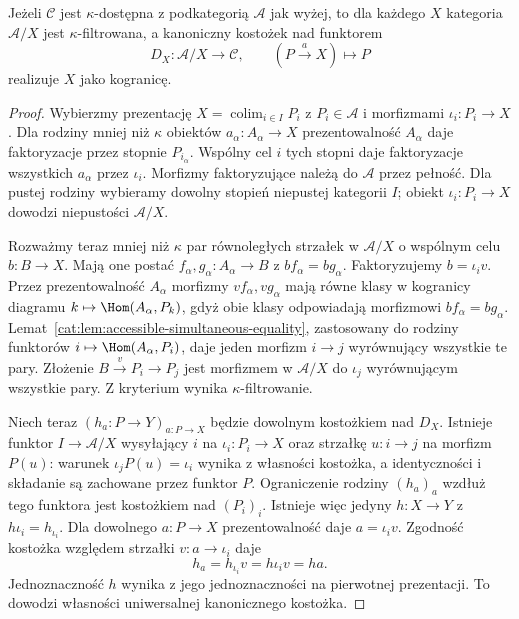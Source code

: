 \begin{twierdzenie}\label{cat:thm:accessible-canonical-diagram}
Jeżeli $\mathcal C$ jest $\kappa$-dostępna z podkategorią $\mathcal A$ jak wyżej, to dla każdego $X$ kategoria $\mathcal A/X$ jest $\kappa$-filtrowana, a kanoniczny kostożek nad funktorem
\[
 D_X:\mathcal A/X\longrightarrow\mathcal C,\qquad
 (P\xrightarrow{a}X)\longmapsto P
\]
realizuje $X$ jako kogranicę.
\end{twierdzenie}
\begin{proof}
Wybierzmy prezentację $X=\operatorname{colim}_{i\in I}P_i$ z $P_i\in\mathcal A$ i morfizmami $\iota_i:P_i\to X$. Dla rodziny mniej niż $\kappa$ obiektów $a_\alpha:A_\alpha\to X$ prezentowalność $A_\alpha$ daje faktoryzacje przez stopnie $P_{i_\alpha}$. Wspólny cel $i$ tych stopni daje faktoryzacje wszystkich $a_\alpha$ przez $\iota_i$. Morfizmy faktoryzujące należą do $\mathcal A$ przez pełność. Dla pustej rodziny wybieramy dowolny stopień niepustej kategorii $I$; obiekt $\iota_i:P_i\to X$ dowodzi niepustości $\mathcal A/X$.

Rozważmy teraz mniej niż $\kappa$ par równoległych strzałek w $\mathcal A/X$ o wspólnym celu $b:B\to X$. Mają one postać $f_\alpha,g_\alpha:A_\alpha\to B$ z $bf_\alpha=bg_\alpha$. Faktoryzujemy $b=\iota_i v$. Przez prezentowalność $A_\alpha$ morfizmy $vf_\alpha,vg_\alpha$ mają równe klasy w kogranicy diagramu $k\mapsto\Hom(A_\alpha,P_k)$, gdyż obie klasy odpowiadają morfizmowi $bf_\alpha=bg_\alpha$. Lemat~\ref{cat:lem:accessible-simultaneous-equality}, zastosowany do rodziny funktorów $i\mapsto\Hom(A_\alpha,P_i)$, daje jeden morfizm $i\to j$ wyrównujący wszystkie te pary. Złożenie $B\xrightarrow{v}P_i\to P_j$ jest morfizmem w $\mathcal A/X$ do $\iota_j$ wyrównującym wszystkie pary. Z kryterium wynika $\kappa$-filtrowanie.

Niech teraz $(h_a:P\to Y)_{a:P\to X}$ będzie dowolnym kostożkiem nad $D_X$. Istnieje funktor $I\to\mathcal A/X$ wysyłający $i$ na $\iota_i:P_i\to X$ oraz strzałkę $u:i\to j$ na morfizm $P(u)$: warunek $\iota_jP(u)=\iota_i$ wynika z własności kostożka, a identyczności i składanie są zachowane przez funktor $P$. Ograniczenie rodziny $(h_a)_a$ wzdłuż tego funktora jest kostożkiem nad $(P_i)_i$. Istnieje więc jedyny $h:X\to Y$ z $h\iota_i=h_{\iota_i}$. Dla dowolnego $a:P\to X$ prezentowalność daje $a=\iota_i v$. Zgodność kostożka względem strzałki $v:a\to\iota_i$ daje
\[
 h_a=h_{\iota_i}v=h\iota_i v=ha.
\]
Jednoznaczność $h$ wynika z jego jednoznaczności na pierwotnej prezentacji. To dowodzi własności uniwersalnej kanonicznego kostożka.
\end{proof}

